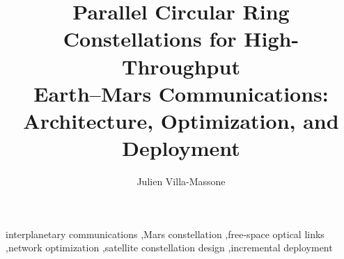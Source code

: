 \begin{frontmatter}

\title{Parallel Circular Ring Constellations for High-Throughput\\Earth--Mars Communications: Architecture, Optimization, and Deployment}

\author{Julien Villa-Massone}
\address{}
\ead{}

\begin{abstract}
\end{abstract}

\begin{keyword}
interplanetary communications \sep Mars constellation \sep free-space optical links \sep network optimization \sep satellite constellation design \sep incremental deployment
\end{keyword}

\end{frontmatter}
